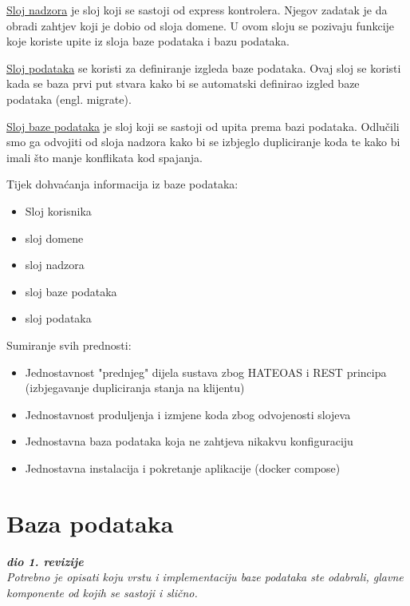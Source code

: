 \underline{Sloj nadzora} je sloj koji se sastoji od express kontrolera. Njegov zadatak je da obradi zahtjev koji je dobio od sloja domene. U ovom sloju se pozivaju funkcije koje koriste upite iz sloja baze podataka i bazu podataka.\hfill \break

\underline{Sloj podataka} se koristi za definiranje izgleda baze podataka. Ovaj sloj se koristi kada se baza prvi put stvara kako bi se automatski definirao izgled baze podataka (engl. migrate).\hfill \break

\underline{Sloj baze podataka} je sloj koji se sastoji od upita prema bazi podataka. Odlučili smo ga odvojiti od sloja nadzora kako bi se izbjeglo dupliciranje koda te kako bi imali što manje konflikata kod spajanja.\hfill \break


Tijek dohvaćanja informacija iz baze podataka:
\begin{itemize}
	\item Sloj korisnika
	\item sloj domene
	\item sloj nadzora
	\item sloj baze podataka
	\item sloj podataka
  \end{itemize}

Sumiranje svih prednosti:
\begin{itemize}
  \item Jednostavnost "prednjeg" dijela sustava zbog HATEOAS i REST principa (izbjegavanje dupliciranja stanja na klijentu)
  \item Jednostavnost produljenja i izmjene koda zbog odvojenosti slojeva
  \item Jednostavna baza podataka koja ne zahtjeva nikakvu konfiguraciju
  \item Jednostavna instalacija i pokretanje aplikacije (docker compose)
\end{itemize}


	
		

		

				
		\section{Baza podataka}
			
			\textbf{\textit{dio 1. revizije}}\\
			
		\textit{Potrebno je opisati koju vrstu i implementaciju baze podataka ste odabrali, glavne komponente od kojih se sastoji i slično.}
		
